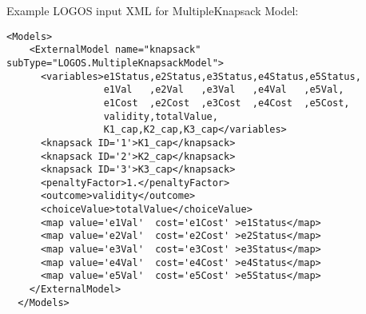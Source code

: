 Example LOGOS input XML for MultipleKnapsack Model:
\begin{lstlisting}[style=XML]
  <Models>
    <ExternalModel name="knapsack" subType="LOGOS.MultipleKnapsackModel">
      <variables>e1Status,e2Status,e3Status,e4Status,e5Status,
                 e1Val   ,e2Val   ,e3Val   ,e4Val   ,e5Val,
                 e1Cost  ,e2Cost  ,e3Cost  ,e4Cost  ,e5Cost,
                 validity,totalValue,
                 K1_cap,K2_cap,K3_cap</variables>
      <knapsack ID='1'>K1_cap</knapsack>
      <knapsack ID='2'>K2_cap</knapsack>
      <knapsack ID='3'>K3_cap</knapsack>
      <penaltyFactor>1.</penaltyFactor>
      <outcome>validity</outcome>
      <choiceValue>totalValue</choiceValue>
      <map value='e1Val'  cost='e1Cost' >e1Status</map>
      <map value='e2Val'  cost='e2Cost' >e2Status</map>
      <map value='e3Val'  cost='e3Cost' >e3Status</map>
      <map value='e4Val'  cost='e4Cost' >e4Status</map>
      <map value='e5Val'  cost='e5Cost' >e5Status</map>
    </ExternalModel>
  </Models>
\end{lstlisting}
